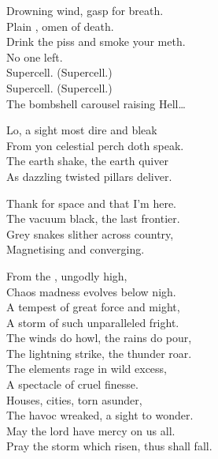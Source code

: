 Drowning wind, gasp for breath. \\
Plain , omen of death. \\
Drink the piss and smoke your meth. \\
No one left. \\

Supercell. (Supercell.) \\
Supercell. (Supercell.) \\
The bombshell carousel raising Hell… \\




Lo, a sight most dire and bleak \\
From yon celestial perch doth speak. \\
The earth shake, the earth quiver \\
As dazzling twisted pillars deliver. \\


Thank  for space and that I'm here. \\
The vacuum black, the last frontier. \\
Grey snakes slither across country, \\
Magnetising and converging. \\


From the , ungodly high, \\
Chaos madness evolves below nigh. \\
A tempest of great force and might, \\
A storm of such unparalleled fright. \\
The winds do howl, the rains do pour, \\
The lightning strike, the thunder roar. \\

The elements rage in wild excess, \\
A spectacle of cruel finesse. \\
Houses, cities, torn asunder, \\
The havoc wreaked, a sight to wonder. \\
May the lord have mercy on us all. \\
Pray the storm which risen, thus shall fall. \\

